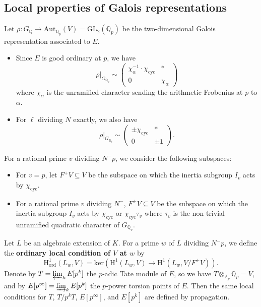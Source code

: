 \documentclass[11pt]{amsart}
\numberwithin{equation}{section}
\theoremstyle{definition}
\begin{document}
\subsection{Local properties of Galois representations}
Let $\rho : G_{\mathbb{Q}} \to \mathrm{Aut}_{\mathbb{Q}_p}(V) = \mathrm{GL}_2(\mathbb{Q}_p)$ be the two-dimensional Galois representation associated to $E$.
\begin{itemize}
\item Since $E$ is good ordinary at $p$, we have
$$\rho \vert_{ G_{\mathbb{Q}_p} } \sim 
\begin{pmatrix}
\chi^{-1}_{\alpha} \cdot \chi_{\mathrm{cyc}} & * \\
0  & \chi_{\alpha}
\end{pmatrix}$$
where $\chi_{\alpha}$ is the unramified character sending the arithmetic Frobenius at $p$ to $\alpha$.
\item For $\ell$ dividing $N$ exactly, we also have
$$\rho \vert_{ G_{\mathbb{Q}_\ell} } \sim 
\begin{pmatrix}
\pm \chi_{\mathrm{cyc}} & * \\
0  & \pm \mathbf{1}
\end{pmatrix} .$$
\end{itemize}
For a rational prime $v$ dividing $N^-p$, we consider the following subspaces:
\begin{itemize}
\item For $v= p$, let $F^+V \subseteq V$ be the subspace on which the inertia subgroup $I_v$ acts by $\chi_{\mathrm{cyc}}$.
\item For a rational prime $v$ dividing $N^-$, $F^+V \subseteq V$ be the subspace on which the inertia subgroup $I_v$ acts by $\chi_{\mathrm{cyc}}$ or $\chi_{\mathrm{cyc}} \tau_v$
where $\tau_v$ is the non-trivial unramified quadratic character of $G_{\mathbb{Q}_v}$.
\end{itemize}
Let $L$ be an algebraic extension of $K$.
For a prime $w$ of $L$ dividing $N^-p$, we define the \textbf{ordinary local condition of $V$ at $w$} by
$$\mathrm{H}^1_{\mathrm{ord}}(L_w, V) = \mathrm{ker} \left( \mathrm{H}^1(L_w, V) \to \mathrm{H}^1(L_w, V/F^+V) \right).$$
Denote by $T = \varprojlim_k E[p^k]$ the $p$-adic Tate module of $E$, so we have $T \otimes_{\mathbb{Z}_p} \mathbb{Q}_p = V$, and by $E[p^\infty] = \varinjlim_k E[p^k]$ the $p$-power torsion points of $E$.
Then the same local conditions for $T$, $T/p^kT$, $E[p^\infty]$, and $E[p^k]$ are defined by propagation.
\end{document}
